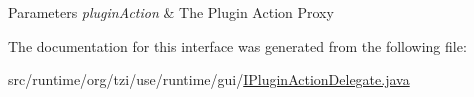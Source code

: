 \begin{DoxyParams}{Parameters}
{\em plugin\-Action} & The Plugin Action Proxy \\
\hline
\end{DoxyParams}


The documentation for this interface was generated from the following file\-:\begin{DoxyCompactItemize}
\item 
src/runtime/org/tzi/use/runtime/gui/\hyperlink{_i_plugin_action_delegate_8java}{I\-Plugin\-Action\-Delegate.\-java}\end{DoxyCompactItemize}
